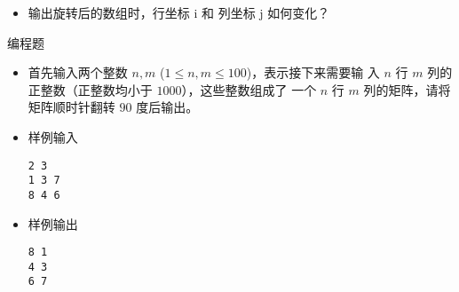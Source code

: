 \begin{frame}[fragile]
{{\begin{columns}[T]
            \end{columns}

            \begin{itemize}
                \item 输出旋转后的数组时，行坐标 i 和 列坐标 j 如何变化？
            \end{itemize}

        }{
            \begin{exampleblock}{编程题}

                \begin{itemize}
                    \item 首先输入两个整数 $n,m$ ($1 \le n,m \le 100$)，表示接下来需要输
                    入 $n$ 行 $m$ 列的正整数（正整数均小于 $1000$），这些整数组成了
                    一个 $n$ 行 $m$ 列的矩阵，请将矩阵顺时针翻转 $90$ 度后输出。
                    
                    \item 样例输入
                    
                    \lstinline|2 3|\\
                    \lstinline|1 3 7|\\
                    \lstinline|8 4 6|

                    \item 样例输出
                    
                    \lstinline|8 1|\\
                    \lstinline|4 3|\\
                    \lstinline|6 7|

                \end{itemize}

            \end{exampleblock}
        }
    }

\end{frame}

